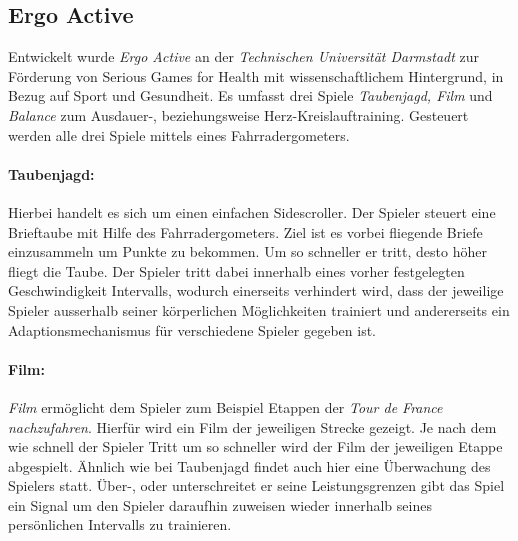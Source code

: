 \subsection{Ergo Active}
Entwickelt wurde \textit{Ergo Active} an der \textit{Technischen Universität Darmstadt} \cite{Gobel:2010:SGH:1873951.1874316} zur Förderung von Serious Games for Health mit wissenschaftlichem Hintergrund, in Bezug auf Sport und Gesundheit. Es umfasst drei Spiele \textit{Taubenjagd, Film} und \textit{Balance} zum Ausdauer-, beziehungsweise Herz-Kreislauftraining. Gesteuert werden alle drei Spiele mittels eines Fahrradergometers.

\paragraph{Taubenjagd:}\noindent
Hierbei handelt es sich um einen einfachen Sidescroller. Der Spieler steuert eine Brieftaube mit Hilfe des Fahrradergometers. Ziel ist es vorbei fliegende Briefe einzusammeln um Punkte zu bekommen. Um so schneller er tritt, desto höher fliegt die Taube. Der Spieler tritt dabei innerhalb eines vorher festgelegten Geschwindigkeit Intervalls, wodurch einerseits verhindert wird, dass der jeweilige Spieler ausserhalb seiner körperlichen Möglichkeiten trainiert und andererseits ein Adaptionsmechanismus für verschiedene Spieler gegeben ist. 

\paragraph{Film:}\noindent
\textit{Film} ermöglicht dem Spieler zum Beispiel Etappen der \textit{Tour de France nachzufahren}. Hierfür wird ein Film der jeweiligen Strecke gezeigt. Je nach dem wie schnell der Spieler Tritt um so schneller wird der Film der jeweiligen Etappe abgespielt. Ähnlich wie bei Taubenjagd findet auch hier eine Überwachung des Spielers statt. Über-, oder unterschreitet er seine Leistungsgrenzen gibt das Spiel ein Signal um den Spieler daraufhin zuweisen wieder innerhalb seines persönlichen Intervalls zu trainieren.

